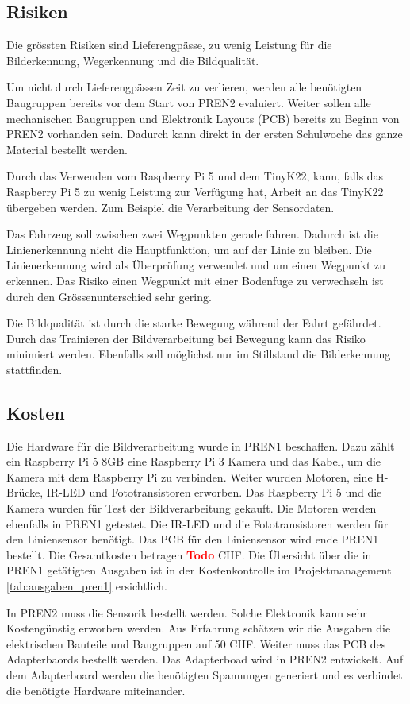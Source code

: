 \documentclass[../main.tex]{subfiles}
\begin{document}
\newpage
\subsection{Risiken}
Die grössten Risiken sind Lieferengpässe, zu wenig Leistung für die Bilderkennung, Wegerkennung und die Bildqualität. 

Um nicht durch Lieferengpässen Zeit zu verlieren, werden alle benötigten Baugruppen bereits vor dem Start von PREN2 evaluiert. Weiter sollen alle mechanischen Baugruppen und Elektronik Layouts (PCB) bereits zu Beginn von PREN2 vorhanden sein. Dadurch kann direkt in der ersten Schulwoche das ganze Material bestellt werden.

Durch das Verwenden vom Raspberry Pi 5 und dem TinyK22, kann, falls das Raspberry Pi 5 zu wenig Leistung zur Verfügung hat, Arbeit an das TinyK22 übergeben werden. Zum Beispiel die Verarbeitung der Sensordaten. 

Das Fahrzeug soll zwischen zwei Wegpunkten gerade fahren. Dadurch ist die Linienerkennung nicht die Hauptfunktion, um auf der Linie zu bleiben. Die Linienerkennung wird als Überprüfung verwendet und um einen Wegpunkt zu erkennen. Das Risiko einen Wegpunkt mit einer Bodenfuge zu verwechseln ist durch den Grössenunterschied sehr gering. 

Die Bildqualität ist durch die starke Bewegung während der Fahrt gefährdet. Durch das Trainieren der Bildverarbeitung bei Bewegung kann das Risiko minimiert werden. Ebenfalls soll möglichst nur im Stillstand die Bilderkennung stattfinden. 

\subsection{Kosten}
Die Hardware für die Bildverarbeitung wurde in PREN1 beschaffen. Dazu zählt ein Raspberry Pi 5 8GB eine Raspberry Pi 3 Kamera und das Kabel, um die Kamera mit dem Raspberry Pi zu verbinden. Weiter wurden Motoren, eine H-Brücke, IR-LED und Fototransistoren erworben. Das Raspberry Pi 5 und die Kamera wurden für Test der Bildverarbeitung gekauft. Die Motoren werden ebenfalls in PREN1 getestet. Die IR-LED und die Fototransistoren werden für den Liniensensor benötigt. Das PCB für den Liniensensor wird ende PREN1 bestellt. Die Gesamtkosten betragen  \textcolor{red}{\textbf{Todo}} CHF. Die Übersicht über die in PREN1 getätigten Ausgaben ist in der Kostenkontrolle im Projektmanagement \ref{tab:ausgaben_pren1} ersichtlich. 

In PREN2 muss die Sensorik bestellt werden. Solche Elektronik kann sehr Kostengünstig erworben werden. Aus Erfahrung schätzen wir die Ausgaben die elektrischen Bauteile und Baugruppen auf 50 CHF. Weiter muss das PCB des Adapterbaords bestellt werden. Das Adapterboad wird in PREN2 entwickelt. Auf dem Adapterboard werden die benötigten Spannungen generiert und es verbindet die benötigte Hardware miteinander. 
\end{document}
